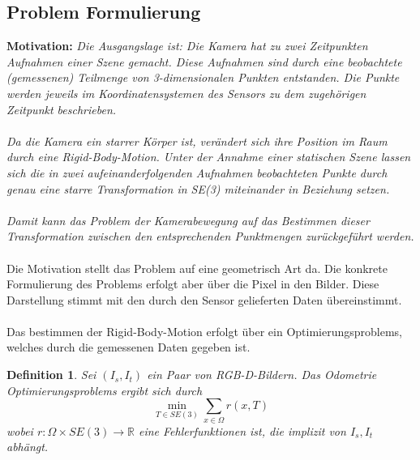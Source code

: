 \documentclass[12pt,DIV=15,BCOR=15mm,twoside,headsepline,abstract=true,listof=totoc,bibliography=totoc]{scrreprt}
\newtheorem{defi}{Definition}
\theoremstyle{remark}    %
\begin{document}
    \subsection{Problem Formulierung}
    \textbf{Motivation:} \emph{\label{mot:odom}Die Ausgangslage ist: Die Kamera hat zu zwei Zeitpunkten Aufnahmen einer Szene gemacht. Diese Aufnahmen sind durch
    eine beobachtete (gemessenen) Teilmenge von 3-dimensionalen Punkten entstanden. Die Punkte werden jeweils im Koordinatensystemen des Sensors zu dem zugehörigen
    Zeitpunkt beschrieben.\\\\
    Da die Kamera ein starrer Körper ist, verändert sich ihre Position im Raum durch eine Rigid-Body-Motion.
    Unter der Annahme einer statischen Szene lassen sich die in zwei aufeinanderfolgenden Aufnahmen beobachteten Punkte durch genau eine starre Transformation in SE(3) 
    miteinander in Beziehung setzen.\\\\
    Damit kann das Problem der Kamerabewegung auf das Bestimmen dieser Transformation zwischen den entsprechenden Punktmengen zurückgeführt werden.}\\\\
    Die Motivation stellt das Problem auf eine geometrisch Art da. Die konkrete Formulierung des Problems erfolgt aber über die Pixel in den Bilder. Diese Darstellung stimmt 
    mit den durch den Sensor gelieferten Daten übereinstimmt.\\\\
    Das bestimmen der Rigid-Body-Motion erfolgt über ein Optimierungsproblems, welches durch die gemessenen Daten gegeben ist.
    \begin{defi}\label{def:odom}
        Sei  $(I_s, I_t)$ ein Paar von RGB-D-Bildern. Das Odometrie Optimierungsproblems ergibt sich durch
        \[\min_{T \in SE(3)} \sum_{x \in \Omega} r(x, T) \]
        wobei $r: \Omega \times SE(3) \to \mathbb{R}$ eine Fehlerfunktionen ist, die implizit von  $I_s, I_t$
        abhängt. \cite{steinbruecker2011real}\cite{Park_2017_ICCV}
    \end{defi}
    
\end{document}
